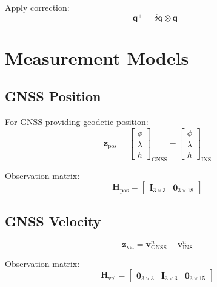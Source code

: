 \documentclass[11pt,a4paper]{article}
\newcommand{\mat}[1]{\mathbf{#1}}
\newcommand{\quat}[1]{\mathbf{#1}}
\begin{document}
Apply correction:
\begin{equation}
    \quat{q}^+ = \delta\quat{q} \otimes \quat{q}^-
\end{equation}

\section{Measurement Models}

\subsection{GNSS Position}

For GNSS providing geodetic position:
\begin{equation}
    \mat{z}_{\text{pos}} = \begin{bmatrix} \phi \\ \lambda \\ h \end{bmatrix}_{\text{GNSS}} - \begin{bmatrix} \phi \\ \lambda \\ h \end{bmatrix}_{\text{INS}}
\end{equation}

Observation matrix:
\begin{equation}
    \mat{H}_{\text{pos}} = \begin{bmatrix}
        \mat{I}_{3\times3} & \mat{0}_{3\times18}
    \end{bmatrix}
\end{equation}

\subsection{GNSS Velocity}

\begin{equation}
    \mat{z}_{\text{vel}} = \mat{v}_{\text{GNSS}}^n - \mat{v}_{\text{INS}}^n
\end{equation}

Observation matrix:
\begin{equation}
    \mat{H}_{\text{vel}} = \begin{bmatrix}
        \mat{0}_{3\times3} & \mat{I}_{3\times3} & \mat{0}_{3\times15}
    \end{bmatrix}
\end{equation}
\end{document}
